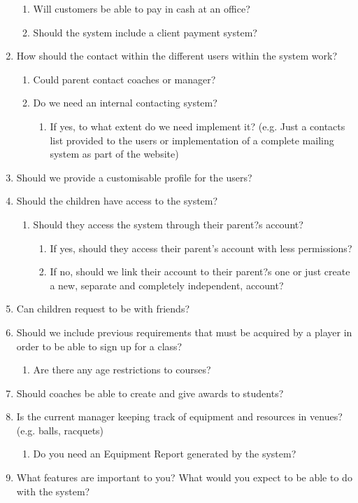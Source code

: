 \documentclass{l3proj}
\begin{document}
\begin{enumerate}
\begin{enumerate}
		\item Will customers be able to pay in cash at an office?
		\item Should the system include a client payment system?
		\end{enumerate}
\item How should the contact within the different users within the system work?
		\begin{enumerate}
		\item Could parent contact coaches or manager?
		\item Do we need an internal contacting system?
			\begin{enumerate}
			\item If yes, to what extent do we need implement it? (e.g. Just a contacts list provided to the users or implementation of a complete mailing system as part of the website)
			\end{enumerate}
		\end{enumerate}
\item Should we provide a customisable profile for the users?
\item Should the children have access to the system?
		\begin{enumerate}
		\item Should they access the system through their parent?s account?
			\begin{enumerate}
			\item If yes, should they access their parent's account with less permissions?
			\item If no, should we link their account to their parent?s one or just create a new, separate and completely independent, account?
			\end{enumerate}
		\end{enumerate}
\item Can children request to be with friends?
\item Should we include previous requirements that must be acquired by a player in order to be able to sign up for a class?
	\begin{enumerate}
	\item Are there any age restrictions to courses?
	\end{enumerate}
\item Should coaches be able to create and give awards to students?
\item Is the current manager keeping track of equipment and resources in venues? (e.g. balls, racquets)
	\begin{enumerate}
	\item Do you need an Equipment Report generated by the system?
	\end{enumerate}
\item What features are important to you? What would you expect to be able to do with the system?
\end{enumerate}
\end{document}

